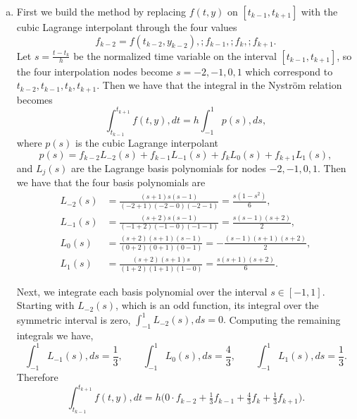 \documentclass{article}
\begin{document}
\begin{enumerate}[(a)]
    \item %
    First we build the method by replacing $f(t,y)$ on $[t_{k-1},t_{k+1}]$ with the cubic Lagrange interpolant through the four values
    \[
    f_{k-2}=f(t_{k-2},y_{k-2}),; f_{k-1},; f_k,; f_{k+1}.
    \]
    Let $s = \frac{t-t_k}{h}$ be the normalized time variable on the interval $[t_{k-1},t_{k+1}]$,
    so the four interpolation nodes become $s=-2,-1,0,1$ which correspond to $t_{k-2},t_{k-1},t_k,t_{k+1}$. Then we have that the integral in the Nyström relation becomes
   \[
    \int_{t_{k-1}}^{t_{k+1}} f(t,y),dt
    = h\int_{-1}^{1} p(s),ds,
   \]
    where $p(s)$ is the cubic Lagrange interpolant
   \[
    p(s)=f_{k-2}L_{-2}(s)+f_{k-1}L_{-1}(s)+f_k L_0(s)+f_{k+1}L_{1}(s),
   \]
    and $L_j(s)$ are the Lagrange basis polynomials for nodes $-2,-1,0,1$. Then we have that the four basis polynomials are
   \[
    \begin{aligned}
    L_{-2}(s)&=\frac{(s+1)s(s-1)}{(-2+1)(-2-0)(-2-1)}
    =\frac{s(1-s^2)}{6}, \\
    L_{-1}(s)&=\frac{(s+2)s(s-1)}{(-1+2)(-1-0)(-1-1)}
    =\frac{s(s-1)(s+2)}{2}, \\
    L_{0}(s)&=\frac{(s+2)(s+1)(s-1)}{(0+2)(0+1)(0-1)}
    =-\frac{(s-1)(s+1)(s+2)}{2}, \\
    L_{1}(s)&=\frac{(s+2)(s+1)s}{(1+2)(1+1)(1-0)}
    =\frac{s(s+1)(s+2)}{6}.
    \end{aligned}
   \]

    Next, we integrate each basis polynomial over the interval $s \in [-1, 1]$. Starting with $L_{-2}(s)$, which is an odd function, its integral over the symmetric interval is zero, $\int_{-1}^{1} L_{-2}(s),ds=0.$
    Computing the remaining integrals we have,
   \[
    \int_{-1}^{1} L_{-1}(s),ds=\frac{1}{3},\qquad
    \int_{-1}^{1} L_{0}(s),ds=\frac{4}{3},\qquad
    \int_{-1}^{1} L_{1}(s),ds=\frac{1}{3}.
   \]
    Therefore
   \[
    \int_{t_{k-1}}^{t_{k+1}} f(t,y),dt
    = h\Big(0\cdot f_{k-2}+\tfrac{1}{3}f_{k-1}+\tfrac{4}{3}f_k+\tfrac{1}{3}f_{k+1}\Big).
   \]


\end{enumerate}
\end{document}
